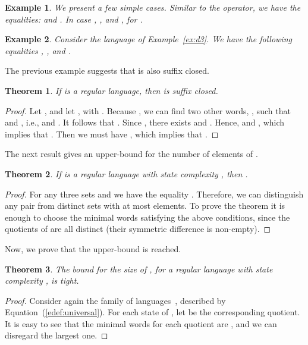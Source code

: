 \documentclass{article}
\newtheorem{theorem}{Theorem}
\newtheorem{example}{Example}
\begin{document}
\begin{example}
\label{ex:dismt} We present a few simple cases. Similar to the  operator, 
we have the equalities:
 and . 
In case , , and 
 , for .
\end{example}

\begin{example}
  \label{ex:dmin}
  Consider the language  of Example~\ref{ex:d3}. 
We have the following equalities
, 
, and  
.
\end{example}

The previous example suggests that  is also suffix closed.
   
\begin{theorem}
\label{theo:mindist_is_suffix_closed}
If  is a regular language, then  is suffix closed.
\end{theorem}
\begin{proof}
  Let , and let , with . 
Because ,
  we can find two other words, , such that
 and , i.e.,
 and . 
It follows that .
Since ,  there exists 
 and .
Hence,  and , which implies that 
. Then we must have , which implies that  
. 
\end{proof}

The next result gives an upper-bound for the number of elements of .

\begin{theorem}
\label{theo:mindist_upp_bound_set}
If  is a regular language with state complexity , 
then .
\end{theorem}
\begin{proof}
For any three sets  and  we have the equality .
Therefore, we can distinguish any pair from  distinct sets with at most  elements. 
To prove the theorem it is enough to choose the minimal words satisfying the above conditions,
 since the  quotients of  are all distinct (their symmetric difference is non-empty). 
\end{proof}

Now, we prove that the upper-bound is reached.
\begin{theorem}
\label{theo:mindist_bound_tight}
    The bound  for the size of , for a
    regular language  with state complexity , is tight. 
\end{theorem}
\begin{proof}
Consider again the family of languages~, 
described by  Equation~(\ref{edef:universal}). 
For each state  of , let  be 
the corresponding quotient. 
It is easy to see that the minimal words for each quotient  are , 
and we can disregard the largest one. 
 \end{proof}
\end{document}
